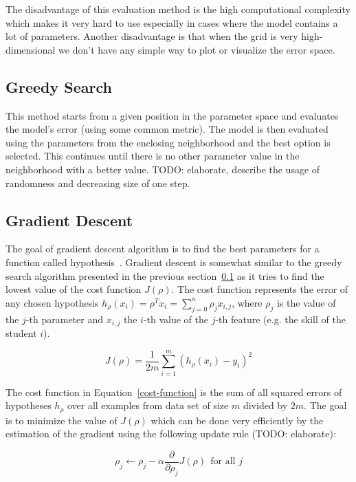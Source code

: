 The disadvantage of this evaluation method is the high computational complexity which makes it very hard to use especially in cases where the model contains a lot of parameters. Another disadvantage is that when the grid is very high-dimensional we don't have any simple way to plot or visualize the error space.

\subsection{Greedy Search}
\label{greedy-search}

This method starts from a given position in the parameter space and evaluates the model's error (using some common metric). The model is then evaluated using the parameters from the enclosing neighborhood and the best option is selected. This continues until there is no other parameter value in the neighborhood with a better value. TODO: elaborate, describe the usage of randomness and decreasing size of one step.

\subsection{Gradient Descent}
\label{gradient-descent}

The goal of gradient descent algorithm is to find the best parameters for a function called hypothesis~\cite{Klusasek2014}. Gradient descent is somewhat similar to the greedy search algorithm presented in the previous section~\ref{greedy-search} as it tries to find the lowest value of the cost function $J(\rho)$. The cost function represents the error of any chosen hypothesis $h_{\rho}(x_i) = \rho^T x_i = \sum^n_{j=0} \rho_j x_{i,j}$, where $\rho_j$ is the value of the $j$-th parameter and $x_{i,j}$ the $i$-th value of the $j$-th feature (e.g. the skill of the student $i$).

\begin{equation} \label{cost-function}
  J(\rho) = \frac{1}{2m} \sum^m_{i=1} (h_{\rho}(x_i) - y_i)^2
\end{equation}

The cost function in Equation~\ref{cost-function} is the sum of all squared errors of hypotheses $h_{\rho}$ over all examples from data set of size $m$ divided by $2m$. The goal is to minimize the value of $J(\rho)$ which can be done very efficiently by the estimation of the gradient using the following update rule (TODO: elaborate):

\begin{equation} \label{cost-function-update}
  \rho_j \gets \rho_j - \alpha \frac{\partial}{\partial \rho_j} J(\rho)~~\text{for all } j
\end{equation}


